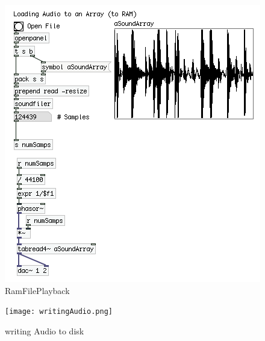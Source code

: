 \begin{figure}[H]
	\begin{center}
		\includegraphics[scale = 1]{img/RamFilePlayback.png}
		\caption{RamFilePlayback}
		\label{fig:RamFilePlayback}
	\end{center}
\end{figure}



\begin{figure}[H]
	\begin{center}
		\texttt{[image: writingAudio.png]}
		\caption{writing Audio to disk}
		\label{fig:writing}
	\end{center}
\end{figure}


